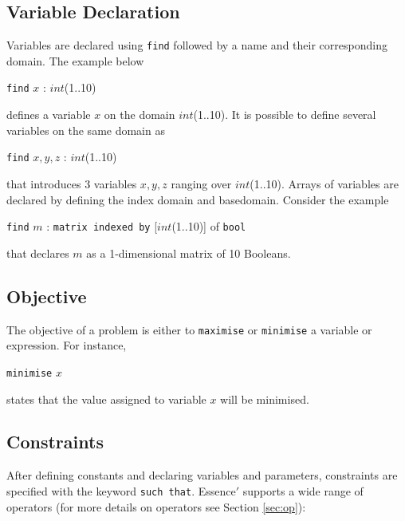 \documentclass[oneside]{book}
\begin{document}
\subsection{Variable Declaration}
Variables are declared using {\tt find} followed by a name and their
corresponding domain. The example below
\begin{center}
{\tt find}  $x$ : $int$(1..10)
\end{center}
defines a variable $x$ on the domain $int$(1..10).
It is possible to define several variables on the same domain as 
\begin{center}
{\tt find}  $x,y,z$ : $int$(1..10)
\end{center}
that introduces 3 variables $x,y,z$ ranging over $int$(1..10).
Arrays of variables are declared by defining the index domain and
basedomain. Consider the example
\begin{center}
{\tt find}  $m$ : {\tt matrix indexed by} [$int$(1..10)] of {\tt bool}
\end{center}
that declares $m$ as a 1-dimensional matrix of 10 Booleans. 


\subsection{Objective}
The objective of a problem is either to {\tt maximise} or 
{\tt minimise} a variable or expression. For instance,
\begin{center}
{\tt minimise} $x$
\end{center}
states that the value assigned to variable $x$ will be minimised.


\subsection{Constraints}
After defining constants and declaring variables and parameters,
constraints are specified with the keyword {\tt such that}.
 {\sc Essence}$'$ supports a wide range of operators (for more details
on operators see Section \ref{sec:op}):

\end{document}
